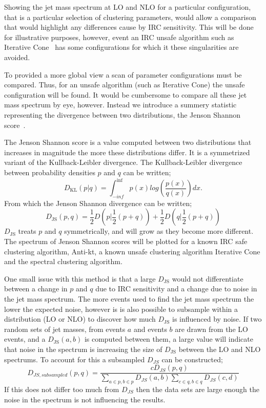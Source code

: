     Showing the jet mass spectrum at LO and NLO for a particular configuration,
    that is a particular selection of clustering parameters,
    would allow a comparison that would highlight any differences cause by IRC sensitivity.
    This will be done for illustrative purposes,
    however, event an IRC unsafe algorithm such as Iterative Cone~\cite{cacciari_antikt2018}
     has some configurations for which it these singularities are avoided.

    To provided a more global view a scan of parameter configurations must be compared.
    Thus, for an unsafe algorithm (such as Iterative Cone) the unsafe configuration
    will be found.
    It would be cumbersome to compare all these jet mass spectrum by eye, however.
    Instead we introduce a summery statistic representing the divergence between two distributions,
    the Jenson Shannon score~\cite{jensen_shannon}.

    The Jenson Shannon score is a value computed between two distributions that increases in magnitude the more these distributions differ.
    It is a symmetrized variant of the Kullback-Leibler divergence.
    The Kullback-Leibler divergence between probability densities \(p\) and \(q\) can be written;
    \[D_\text{KL} (p | q) = \int^{\inf}_{-inf} p(x) log\left(\frac{p(x)}{q(x)}\right) dx.\]
    From which the Jenson Shannon divergence can be written;
    \[D_\text{JS}(p, q) = \frac{1}{2}D\left(p | \frac{1}{2}(p + q)\right) + \frac{1}{2}D\left(q | \frac{1}{2}(p + q)\right)\]
    \(D_\text{JS}\) treats \(p\) and \(q\) symmetrically, and will grow as they become more different.
    The spectrum of Jenson Shannon scores will be plotted for a known IRC safe clustering algorithm, Anti-kt,
    a known unsafe clustering algorithm Iterative Cone and the spectral clustering algorithm.

    One small issue with this method is that a large \(D_\text{JS}\) would not differentiate
    between a change in \(p\) and \(q\) due to IRC sensitivity and 
    a change due to noise in the jet mass spectrum.
    The more events used to find the jet mass spectrum the lower the expected noise,
    however is is also possible to subsample within a distribution (LO or NLO)
    to discover how much \(D_\text{JS}\) is influenced by noise.
    If two random sets of jet masses, from events \(a\) and events \(b\) are drawn from the LO events,
    and a \(D_\text{JS}(a, b)\) is computed between them, a large value will indicate that 
    noise in the spectrum is increasing the size of \(D_\text{JS}\) between the LO and NLO spectrums.
    To account for this a subsampled \(D_{JS}\) can be constructed;
    \[D_{JS, subsampled}(p, q) = \frac{cD_{JS}(p, q)}{\sum_{a \in p, b \in p} D_{JS}(a, b)\sum_{c \in q, b \in q} D_{JS}(c, d)}\]
    If this does not differ too much from \(D_{JS}\) then the data sets are large enough the noise in
    the spectrum is not influencing the results.
